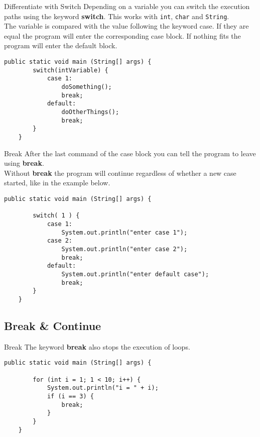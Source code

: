 \begin{frame}[fragile]{Differentiate with Switch}
	Depending on a variable you can switch the execution paths using the keyword \textbf{switch}.
	This works with \texttt{int}, \texttt{char} and \texttt{String}. \\
	\vfill
	The variable is compared 
	with the value following the keyword case.
	If they are equal the program will enter the corresponding case block.
	If nothing fits the program will enter the default block.
	\begin{lstlisting}[basicstyle=\ttfamily\scriptsize]
	public static void main (String[] args) {
	    switch(intVariable) {
	        case 1:
	            doSomething();
	            break;
	        default:
	            doOtherThings();
	            break;
	    }
	}
	\end{lstlisting}
\end{frame}
\begin{frame}[fragile]{Break}
	After the last command of the case block	you can tell the program to leave using \textbf{break}.\\
	Without \textbf{break} the program will continue regardless of
	whether a new case started, like in the example below.
	\begin{lstlisting}[basicstyle=\ttfamily\scriptsize]
	public static void main (String[] args) {
	
	    switch( 1 ) {
	        case 1:
	            System.out.println("enter case 1");
	        case 2:
	            System.out.println("enter case 2");
	            break;
	        default:
	            System.out.println("enter default case");
	            break;
	    }
	}
	\end{lstlisting}
\end{frame}

\subsection{Break \& Continue}
\begin{frame}[fragile]{Break}
	The keyword \textbf{break} also stops the execution of loops.
	\begin{lstlisting}[basicstyle=\ttfamily\scriptsize]
	public static void main (String[] args) {
	
	    for (int i = 1; 1 < 10; i++) {
	        System.out.println("i = " + i);
	        if (i == 3) {
	            break;
	        }
	    }
	}
	\end{lstlisting}
\end{frame}

